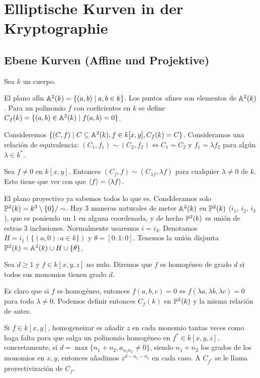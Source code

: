 \documentclass[CR.tex]{subfiles}
\begin{document}

\chapter{Elliptische Kurven in der Kryptographie}
\section{Ebene Kurven (Affine und Projektive)}
Sea $k$ un cuerpo. 
\begin{defi}
El plano afín $\mathbb{A}^2(k)=\{(a,b)\mid a,b\in k\}$. Los puntos afines son elementos de $\mathbb{A}^2(k)$. Para un polinomio $f$ con coeficientes en $k$ se define $C_f(k)=\{(a,b)\in\mathbb{A}^2(k)\mid f(a,b)=0\}$. 
\end{defi}

Consideremos $\{(C,f)\mid C\subseteq\mathbb{A}^2(k), f\in k[x,y], C_f(k)=C\}$. Consideramos una relación de equivalencia: $(C_1,f_1)\sim (C_2,f_2)\Leftrightarrow C_1=C_2$ y $f_1=\lambda f_2$ para algún $\lambda\in k^*$. 

\begin{nota}
Sea $f\neq 0$ en $k[x,y]$. Entonces $(C_f,f)\sim (C_{\lambda f},\lambda f)$ para cualquier $\lambda\neq 0$ de $k$. Esto tiene que ver con que $\langle{f}\rangle=\langle{\lambda f}\rangle$.
\end{nota}

El plano proyectivo ya sabemos todos lo que es. ConsIderamos solo $\mathbb{P}^2(k)=k^3\setminus\{0\}/\sim$. Hay 3 maneras naturales de meter $\mathbb{A}^2(k)$ en $\mathbb{P}^2(k)$ ($i_1$, $i_2$, $i_3$), que es poniendo un 1 en alguna coordenada, y de hecho $\mathbb{P}^2(k)$ es unión de estras 3 inclusiones. Normalmente usaremos $i=i_3$. Denotamos $H=i_1(\{(a,0):a\in k\})$ y $\theta=[0:1:0]$. Tenemos la unión disjunta $\mathbb{P}^2(k)=\mathbb{A}^2(k)\cup H\cup \{\theta\}$. 

\begin{defi}
Sea $d\geq 1$ y $f\in k[x,y,z]$ no nulo. Diremos que $f$ es homogéneo de grado $d$ si todos sus monomios tienen grado $d$. 
\end{defi}

Es claro que si $f$ es homogéneo, entonces $f(a,b,c)=0\Leftrightarrow f(\lambda a,\lambda b,\lambda c)=0$ para todo $\lambda\neq 0$. Podemos definir entonces $C_f(k)$ en $\mathbb{P}^2(k)$ y la misma relación de antes. 

Si $f\in k[x,y]$, homogeneizar es añadir $z$ en cada monomio tantas veces como haga falta para que salga un polinomio homogéneo en $f^*\in k[x,y,z]$, concretamente, si $d=\max\{n_1+n_2, a_{n_1 n_2}\neq 0\}$, siendo $n_1+n_2$ los grados de los monomios en $x,y$, entonces añadimos $z^{d-n_1-n_2}$ en cada caso. A $C_{f^*}$ se le llama proyectivización de $C_f$. 
\end{document}
